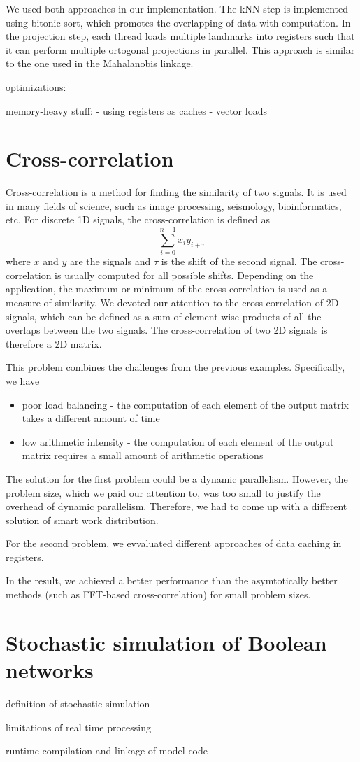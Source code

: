 We used both approaches in our implementation. The kNN step is implemented using bitonic sort, which promotes the overlapping of data with computation. In the projection step, each thread loads multiple landmarks into registers such that it can perform multiple ortogonal projections in parallel. This approach is similar to the one used in the Mahalanobis linkage.

optimizations:

memory-heavy stuff:
- using registers as caches
- vector loads

\section{Cross-correlation}

Cross-correlation is a method for finding the similarity of two signals. It is used in many fields of science, such as image processing, seismology, bioinformatics, etc. For discrete 1D signals, the cross-correlation is defined as
$$ \sum_{i=0}^{n-1} x_i y_{i + \tau} $$
where $x$ and $y$ are the signals and $\tau$ is the shift of the second signal. The cross-correlation is usually computed for all possible shifts. Depending on the application, the maximum or minimum of the cross-correlation is used as a measure of similarity.
We devoted our attention to the cross-correlation of 2D signals, which can be defined as a sum of element-wise products of all the overlaps between the two signals. The cross-correlation of two 2D signals is therefore a 2D matrix.

This problem combines the challenges from the previous examples. Specifically, we have
\begin{itemize}
    \item poor load balancing - the computation of each element of the output matrix takes a different amount of time
    \item low arithmetic intensity - the computation of each element of the output matrix requires a small amount of arithmetic operations
\end{itemize}

The solution for the first problem could be a dynamic parallelism. However, the problem size, which we paid our attention to, was too small to justify the overhead of dynamic parallelism. Therefore, we had to come up with a different solution of smart work distribution.

For the second problem, we evvaluated different approaches of data caching in registers.

In the result, we achieved a better performance than the asymtotically better methods (such as FFT-based cross-correlation) for small problem sizes.

\section{Stochastic simulation of Boolean networks}

definition of stochastic simulation

limitations of real time processing

runtime compilation and linkage of model code